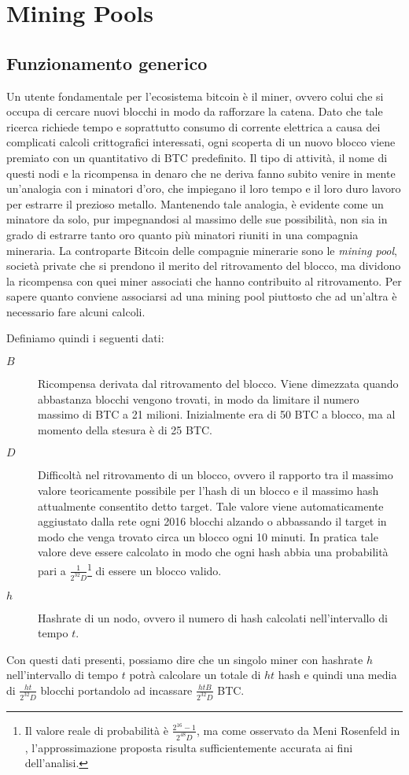 \chapter{Mining Pools}\label{mining-pool}

\section{Funzionamento generico}

Un utente fondamentale per l'ecosistema bitcoin è il miner, ovvero colui che si occupa di cercare nuovi blocchi in modo da rafforzare la catena. Dato che tale ricerca richiede tempo e soprattutto consumo di corrente elettrica a causa dei complicati calcoli crittografici interessati, ogni scoperta di un nuovo blocco viene premiato con un quantitativo di BTC predefinito.
Il tipo di attività, il nome di questi nodi e la ricompensa in denaro che ne deriva fanno subito venire in mente un'analogia con i minatori d'oro, che impiegano il loro tempo e il loro duro lavoro per estrarre il prezioso metallo.
Mantenendo tale analogia, è evidente come un minatore da solo, pur impegnandosi al massimo delle sue possibilità, non sia in grado di estrarre tanto oro quanto più minatori riuniti in una compagnia mineraria. La controparte Bitcoin delle compagnie minerarie sono le \emph{mining pool}, società private che si prendono il merito del ritrovamento del blocco, ma dividono la ricompensa con quei miner associati che hanno contribuito al ritrovamento.
Per sapere quanto conviene associarsi ad una mining pool piuttosto che ad un'altra è necessario fare alcuni calcoli.

Definiamo quindi i seguenti dati:
\begin{description}
    \item[$B$] Ricompensa derivata dal ritrovamento del blocco. Viene dimezzata quando abbastanza blocchi vengono trovati, in modo da limitare il numero massimo di BTC a 21 milioni. Inizialmente era di 50 BTC a blocco, ma al momento della stesura è di 25 BTC.
    \item[$D$] Difficoltà nel ritrovamento di un blocco, ovvero il rapporto tra il massimo valore teoricamente possibile per l'hash di un blocco e il massimo hash attualmente consentito detto target. Tale valore viene automaticamente aggiustato dalla rete ogni 2016 blocchi alzando o abbassando il target in modo che venga trovato circa un blocco ogni 10 minuti. In pratica tale valore deve essere calcolato in modo che ogni hash abbia una probabilità pari a $\frac{1}{2^{32} D}$\footnote{Il valore reale di probabilità è $\frac{2^{16} - 1}{2^{48} D}$, ma come osservato da Meni Rosenfeld in \cite{pool-analysis}, l'approssimazione proposta risulta sufficientemente accurata ai fini dell'analisi.} di essere un blocco valido.
    \item[$h$] Hashrate di un nodo, ovvero il numero di hash calcolati nell'intervallo di tempo $t$.
\end{description}
Con questi dati presenti, possiamo dire che un singolo miner con hashrate $h$ nell'intervallo di tempo $t$ potrà calcolare un totale di $ht$ hash e quindi una media di $\frac{ht}{2^{32}D}$ blocchi portandolo ad incassare $\frac{htB}{2^{32} D}$ BTC.


